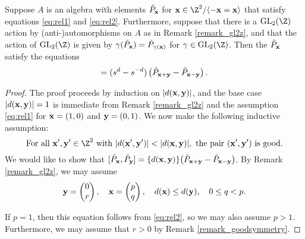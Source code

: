 \begin{proposition}\label{lemma_allfromsome}
	Suppose $A$ is an algebra with elements $\tilde{P}_{\mathbf{x}}$ for $\xx \in \Z^2/\langle -\xx = \xx \rangle$ that satisfy equations \eqref{eq:rel1} and \eqref{eq:rel2}. Furthermore, suppose that there is a $\GL_2(\Z)$ action by (anti-)automorphisms on $A$ as in Remark \ref{remark_gl2z}, and that the action of $\GL_2(\Z)$ is given by $\gamma(\tilde{P}_{\mathbf{x}}) = \tilde{P}_{\gamma({\mathbf{x}})}$  for $\gamma \in \GL_2(\Z)$.  Then the $\tilde{P}_{\mathbf{x}}$ satisfy the equations 
	\begin{equation*}
		[\tilde{P}_\xx, \tilde{P}_\yy] = (s^d - s^{-d})\left( \tilde{P}_{\xx+\yy} - \tilde{P}_{\xx-\yy}\right).
	\end{equation*}
\end{proposition}
\begin{proof}
	The proof proceeds by induction on $\lvert d({\mathbf{x}},{\mathbf{y}})\rvert $, and the base case $\lvert d({\mathbf{x}},{\mathbf{y}})\rvert = 1$ is immediate from Remark \ref{remark_gl2z} and the assumption \eqref{eq:rel1} for ${\mathbf{x}} = (1,0)$ and ${\mathbf{y}} = (0,1)$. We now make the following inductive assumption:
	\begin{equation}\label{assumption1} 
	\textrm{For all } \xx',\yy' \in \Z^2\textrm{ with } \lvert d(\xx',\yy')\rvert < \lvert d(\xx,\yy) \rvert, \textrm{ the pair } (\xx',\yy') \textrm{ is good.}
	\end{equation}
	We would like to show that $[\tilde{P}_{{\mathbf{x}}},\tilde{P}_{{\mathbf{y}}}] = \{d({\mathbf{x}},{\mathbf{y}})\} \big( \tilde{P}_{{\mathbf{x}} + {\mathbf{y}}} - \tilde{P}_{{\mathbf{x}}-{\mathbf{y}}} \big)$. By Remark \ref{remark_gl2z}, we may assume
	\[
	{\mathbf{y}} = \begin{pmatrix}0\\r\end{pmatrix},\quad {\mathbf{x}} = \begin{pmatrix}p\\q\end{pmatrix},\quad d({\mathbf{x}}) \leq d({\mathbf{y}}),\quad 0 \leq q < p.
	\]
	
	If $p=1$, then this equation follows from \eqref{eq:rel2}, so we may also assume $p > 1$. Furthermore, we may assume that $r>0$ by Remark \ref{remark_goodsymmetry}. 


\end{proof}
